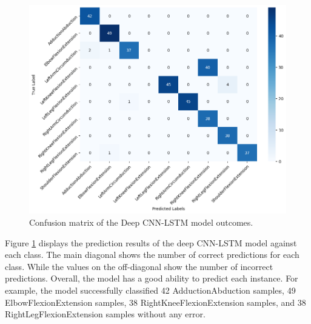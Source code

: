 \begin{figure}[h!]
	\centering
	\includegraphics[width=1\textwidth]{bab4/ar_DeepCNNLSTM_Confmatrix.png}
	\caption{Confusion matrix of the Deep CNN-LSTM model outcomes.}
	\label{fig:DeepCNNLSTM_Confmatrix}
\end{figure}

Figure \ref{fig:DeepCNNLSTM_Confmatrix} displays the prediction results of the deep CNN-LSTM model against each class. The main diagonal shows the number of correct predictions for each class. While the values on the off-diagonal show the number of incorrect predictions. Overall, the model has a good ability to predict each instance. For example, the model successfully classified 42 AdductionAbduction samples, 49 ElbowFlexionExtension samples, 38 RightKneeFlexionExtension samples, and 38 RightLegFlexionExtension samples without any error.

